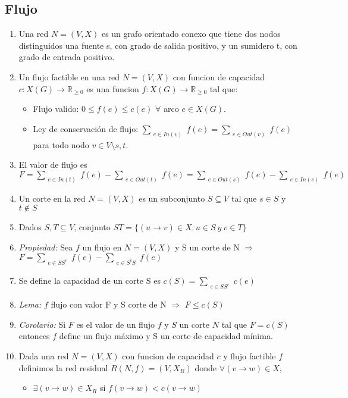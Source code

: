 \subsection{Flujo}
\begin{enumerate}
\item Una red $N=(V,X)$ es un grafo orientado conexo que tiene dos nodos distinguidos una fuente s, con grado de salida positivo, y un sumidero t, con grado de entrada positivo.
\item Un flujo factible en una red $N=(V,X)$ con funcion de capacidad $c:X(G) \rightarrow \mathbb{R}_{\geq 0}$ es una funcion $f:X(G) \rightarrow \mathbb{R}_{\geq 0}$ tal que:
    \begin{itemize}
        \item Flujo valido: $0 \leq f(e) \leq c(e)$ $\forall$ arco $e \in X(G)$.
        \item Ley de conservación de flujo: $\sum_{\substack{e \in In(v)}}f(e) = \sum_{\substack{e \in Out(v)}}f(e)$ para todo nodo $v \in V \setminus {s,t}$.
    \end{itemize}
\item El valor de flujo es $F=\sum_{\substack{e \in In(t)}}f(e) - \sum_{\substack{e \in Out(t)}}f(e) = \sum_{\substack{e \in Out(s)}}f(e) - \sum_{\substack{e \in In(s)}}f(e)$
\item Un corte en la red $N=(V,X)$ es un subconjunto $S\subseteq V$ tal que $s \in S$ y $t \notin S$
\item Dados $S,T \subseteq V$, conjunto $ST=\{(u\rightarrow v) \in X : u\in S\  y\ v\in T\}$
\item \textit{Propiedad:} Sea $f$ un flujo en $N=(V,X)$ y S un corte de N $\Rightarrow$ $F=\sum_{\substack{e \in SS^{c}}}f(e) - \sum_{\substack{e \in S^{c}S}}f(e)$
\item Se define la capacidad de un corte S es $c(S)=\sum_{\substack{e \in SS^{c}}}c(e)$
\item \textit{Lema:} $f$ flujo con valor F y S corte de N $\Rightarrow$ $F \leq c(S)$
\item \textit{Corolario:} Si $F$ es el valor de un flujo $f$ y $S$ un corte $N$ tal que $F=c(S)$ entonces $f$ define un flujo máximo y S un corte de capacidad mínima.
\item Dada una red $N=(V,X)$ con funcion de capacidad $c$ y flujo factible $f$ definimos la red residual $R(N,f)=(V,X_{R})$ donde $\forall (v\rightarrow w) \in X$,
    \begin{itemize}
        \item $\exists (v\rightarrow w)\in X_{R}$ si $f(v\rightarrow w)< c(v\rightarrow w)$

\end{itemize}
\end{enumerate}
